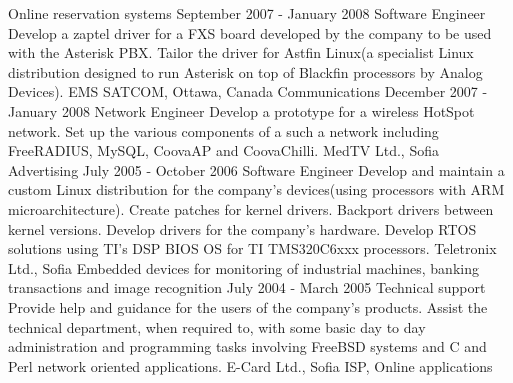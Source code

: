 {
  Online reservation systems
}
\ecvitem{}{} %
\ecvitem{}{} %
{
  September 2007 - January 2008
}
{
  Software Engineer
}
{
  Develop a zaptel driver for a FXS board developed by
  the company to be used with the Asterisk PBX. Tailor the driver for Astfin Linux(a specialist Linux
  distribution designed to run Asterisk on top of Blackfin processors by Analog Devices).
}
{
  EMS SATCOM, Ottawa, Canada
}
{
  Communications
}
\ecvitem{}{} %
\ecvitem{}{} %
{
  December 2007 - January 2008
}
{
  Network Engineer
}
{
  Develop a prototype for a wireless HotSpot network.
  Set up the various components of a such a network including FreeRADIUS, MySQL, CoovaAP and
  CoovaChilli.
}
{
  MedTV Ltd., Sofia
}
{
  Advertising
}
\ecvitem{}{} %
\ecvitem{}{} %
{
  July 2005 - October 2006
}
{
  Software Engineer
}
{
  Develop and maintain a custom Linux distribution for
  the company's devices(using processors with ARM microarchitecture). Create patches for kernel
  drivers. Backport drivers between kernel versions. Develop drivers for the company's hardware.
  Develop RTOS solutions using TI's DSP BIOS OS for TI TMS320C6xxx processors.
}
{
  Teletronix Ltd., Sofia
}
{
  Embedded devices for monitoring of industrial machines, banking
  transactions and image recognition
}
\ecvitem{}{} %
\ecvitem{}{} %
{
  July 2004 - March 2005
}
{
  Technical support
}
{
  Provide help and guidance for the users of the
  company's products. Assist the technical department, when required to, with some basic day to day
  administration and programming tasks involving FreeBSD systems and C and Perl network oriented
  applications.
}
{
  E-Card Ltd., Sofia
}
{
  ISP, Online applications
}



